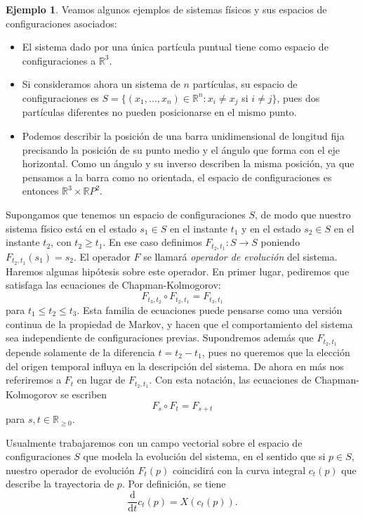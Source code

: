 \documentclass[11pt, a4paper]{article}
\newcommand{\RR}{\mathbb{R}}
\theoremstyle{plain}
\theoremstyle{definition}
\newtheorem{exmp}[prop]{Ejemplo}
\begin{document}
\begin{exmp} Veamos algunos ejemplos de sistemas físicos y sus espacios de configuraciones asociados:
\begin{itemize}
\item El sistema dado por una única partícula puntual tiene como espacio de configuraciones a $\RR^3$.
\item Si consideramos ahora un sistema de $n$ partículas, su espacio de configuraciones es $S=\{(x_1,\dots, x_n)\in\RR^n : x_i\neq x_j$ si $i\neq j\}$, pues dos partículas diferentes no pueden posicionarse en el mismo punto.
\item Podemos describir la posición de una barra unidimensional de longitud fija precisando la posición de su punto medio y el ángulo que forma con el eje horizontal. Como un ángulo y su inverso describen la misma posición, ya que pensamos a la barra como no orientada, el espacio de configuraciones es entonces $\RR^3\times \RR P^2$.
\end{itemize}
\end{exmp}
Supongamos que tenemos un espacio de configuraciones $S$, de modo que nuestro sistema físico está en el estado $s_1\in S$ en el instante $t_1$ y en el estado $s_2\in S$ en el instante $t_2$, con $t_2\geq t_1$. En ese caso definimos $F_{t_2,t_1}:S\to S$ poniendo $F_{t_2,t_1}(s_1)=s_2$. El operador $F$ se llamará \emph{operador de evolución} del sistema. Haremos algunas hipótesis sobre este operador. En primer lugar, pediremos que satisfaga las ecuaciones de Chapman-Kolmogorov:
\[F_{t_3,t_2}\circ F_{t_2,t_1} = F_{t_3,t_1}\]
para $t_1\leq t_2 \leq t_3$. Esta familia de ecuaciones puede pensarse como una versión continua de la propiedad de Markov, y hacen que el comportamiento del sistema sea independiente de configuraciones previas. Supondremos además que $F_{t_2,t_1}$ depende solamente de la diferencia $t=t_2-t_1$, pues no queremos que la elección del origen temporal influya en la descripción del sistema. De ahora en más nos referiremos a $F_t$ en lugar de $F_{t_2,t_1}$. Con esta notación, las ecuaciones de Chapman-Kolmogorov se escriben
\[F_s\circ F_t = F_{s+t}\]
para $s,t\in \RR_{\geq 0}$.

Usualmente trabajaremos con un campo vectorial sobre el espacio de configuraciones $S$ que modela la evolución del sistema, en el sentido que si $p\in S$, nuestro operador de evolución $F_t(p)$ coincidirá con la curva integral $c_t(p)$ que describe la trayectoria de $p$. Por definición, se tiene
\[\frac{\mathrm{d}}{\mathrm{d}t}c_t(p) = X(c_t(p)).\]
\end{document}

